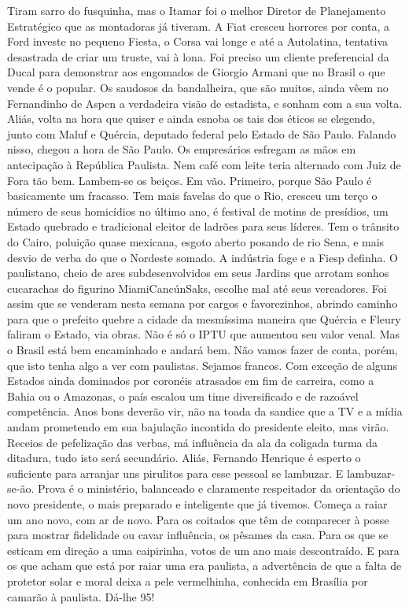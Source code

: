 Tiram sarro do fusquinha, mas o Itamar foi o melhor Diretor de Planejamento Estratégico que as montadoras já tiveram. A Fiat cresceu horrores por conta, a Ford investe no pequeno Fiesta, o Corsa vai longe e até a Autolatina, tentativa desastrada de criar um truste, vai à lona.
Foi preciso um cliente preferencial da Ducal para demonstrar aos engomados de Giorgio Armani que no Brasil o que vende é o popular. Os saudosos da bandalheira, que são muitos, ainda vêem no Fernandinho de Aspen a verdadeira visão de estadista, e sonham com a sua volta.
Aliás, volta na hora que quiser e ainda esnoba os tais dos éticos se elegendo, junto com Maluf e Quércia, deputado federal pelo Estado de São Paulo.
Falando nisso, chegou a hora de São Paulo. Os empresários esfregam as mãos em antecipação à República Paulista. Nem café com leite teria alternado com Juiz de Fora tão bem. Lambem-se os beiços. Em vão.
Primeiro, porque São Paulo é basicamente um fracasso. Tem mais favelas do que o Rio, cresceu um terço o número de seus homicídios no último ano, é festival de motins de presídios, um Estado quebrado e tradicional eleitor de ladrões para seus líderes. Tem o trânsito do Cairo, poluição quase mexicana, esgoto aberto posando de rio Sena, e mais desvio de verba do que o Nordeste somado. A indústria foge e a Fiesp definha.
O paulistano, cheio de ares subdesenvolvidos em seus Jardins que arrotam sonhos cucarachas do figurino MiamiCancúnSaks, escolhe mal até seus vereadores. Foi assim que se venderam nesta semana por cargos e favorezinhos, abrindo caminho para que o prefeito quebre a cidade da mesmíssima maneira que Quércia e Fleury faliram o Estado, via obras. Não é só o IPTU que aumentou seu valor venal.
Mas o Brasil está bem encaminhado e andará bem. Não vamos fazer de conta, porém, que isto tenha algo a ver com paulistas. Sejamos francos. Com exceção de alguns Estados ainda dominados por coronéis atrasados em fim de carreira, como a Bahia ou o Amazonas, o país escalou um time diversificado e de razoável competência.
Anos bons deverão vir, não na toada da sandice que a TV e a mídia andam prometendo em sua bajulação incontida do presidente eleito, mas virão. Receios de pefelização das verbas, má influência da ala da coligada turma da ditadura, tudo isto será secundário.
Aliás, Fernando Henrique é esperto o suficiente para arranjar uns pirulitos para esse pessoal se lambuzar. E lambuzar-se-ão. Prova é o ministério, balanceado e claramente respeitador da orientação do novo presidente, o mais preparado e inteligente que já tivemos.
Começa a raiar um ano novo, com ar de novo. Para os coitados que têm de comparecer à posse para mostrar fidelidade ou cavar influência, os pêsames da casa. Para os que se esticam em direção a uma caipirinha, votos de um ano mais descontraído. E para os que acham que está por raiar uma era paulista, a advertência de que a falta de protetor solar e moral deixa a pele vermelhinha, conhecida em Brasília por camarão à paulista. Dá-lhe 95!
